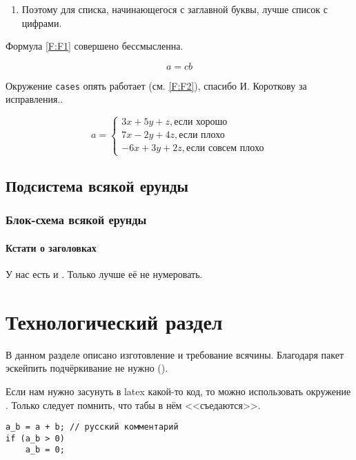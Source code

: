 \documentclass[utf8]{G7-32} %
\begin{document}
\begin{enumerate}
\item Поэтому для списка, начинающегося с заглавной буквы, лучше список с цифрами.
\end{enumerate}

Формула \ref{F:F1} совершено бессмысленна.


\begin{equation}
a= cb
\label{F:F1}
\end{equation}


Окружение \texttt{cases} опять работает (см. \ref{F:F2}), спасибо И. Короткову за исправления..


\begin{equation}
a= \begin{cases}
 3x + 5y + z, \mbox{если хорошо} \\
 7x - 2y + 4z, \mbox{если плохо}\\
 -6x + 3y + 2z, \mbox{если совсем плохо}
\end{cases}
\label{F:F2}
\end{equation}

\section{Подсистема всякой ерунды}

\subsection{Блок-схема всякой ерунды}


\subsubsection*{Кстати о заголовках}

У нас есть и . Только лучше её не нумеровать.

\chapter{Технологический раздел}



В данном разделе описано изготовление и требование всячины. Благодаря пакет  эскейпить подчёркивание  не нужно ().

Если нам нужно засунуть в latex какой-то код, то можно использовать окружение . Только следует помнить, что табы в нём <<съедаются>>. 
\begin{verbatim}
a_b = a + b; // русский комментарий
if (a_b > 0)
    a_b = 0;
\end{verbatim}
\end{document}
